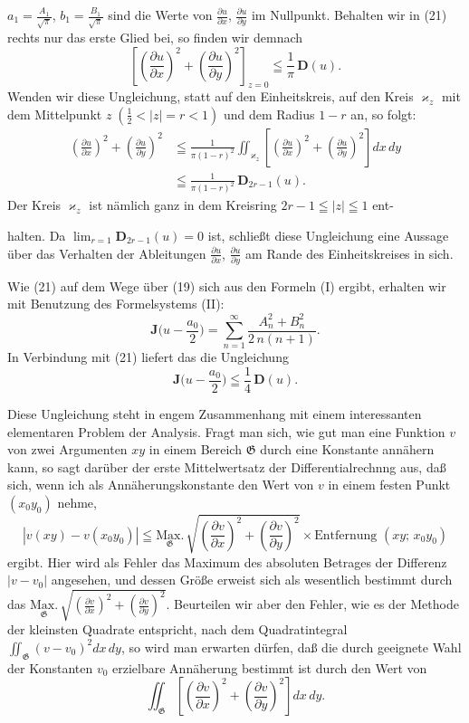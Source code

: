 \documentclass{article}
\begin{document}
$a_1 = \frac{A_1}{\sqrt{\pi}}$, $b_1 = \frac{B_1}{\sqrt{\pi}}$ sind die Werte von $\frac{\partial u}{\partial x}$, $\frac{\partial u}{\partial y}$ im Nullpunkt. Behalten wir in (21) rechts nur das erste Glied bei, so finden wir demnach
\[ \left[ \left(\frac{\partial u}{\partial x}\right)^2 + \left(\frac{\partial u}{\partial y}\right)^2 \right]_{z=0} \leqq \frac{1}{\pi}\,\mathbf{D}(u). \tag{22} \]
Wenden wir diese Ungleichung, statt auf den Einheitskreis, auf den Kreis $\varkappa_z$ mit dem Mittelpunkt $z\;(\frac{1}{2} < |z| = r < 1)$ und dem Radius $1 - r$ an, so folgt:
\[ \begin{aligned}
\left(\frac{\partial u}{\partial x}\right)^2 + \left(\frac{\partial u}{\partial y}\right)^2 &\leqq \frac{1}{\pi(1 - r)^2} \iint_{\varkappa_z} \left[ \left(\frac{\partial u}{\partial x}\right)^2 + \left(\frac{\partial u}{\partial y}\right)^2 \right] dx\,dy \\
&\leqq \frac{1}{\pi(1 - r)^2}\,\mathbf{D}_{2r-1}(u). \tag{23}
\end{aligned} \]
Der Kreis $\varkappa_z$ ist nämlich ganz in dem Kreisring $2r - 1 \leqq |z| \leqq 1$ ent-

halten. Da $\lim_{r=1} \mathbf{D}_{2r-1}(u) = 0$ ist, schließt diese Ungleichung eine Aussage über das Verhalten der Ableitungen $\frac{\partial u}{\partial x}$, $\frac{\partial u}{\partial y}$ am Rande des Einheitskreises in sich.

Wie (21) auf dem Wege über (19) sich aus den Formeln (I) ergibt, erhalten wir mit Benutzung des Formelsystems (II):
\[ \mathbf{J}\Big( u - \frac{a_0}{2} \Big) = \sum_{n=1}^\infty \frac{A_n^2 + B_n^2}{2\,n(n+1)}. \]
In Verbindung mit (21) liefert das die Ungleichung
\[ \mathbf{J}\Big( u - \frac{a_0}{2} \Big) \leqq \frac{1}{4}\,\mathbf{D}(u). \tag{24} \]

Diese Ungleichung steht in engem Zusammenhang mit einem interessanten elementaren Problem der Analysis. Fragt man sich, wie gut man eine Funktion $v$ von zwei Argumenten $xy$ in einem Bereich $\mathfrak{G}$ durch eine Konstante annähern kann, so sagt darüber der erste Mittelwertsatz der Differentialrechnng aus, daß sich, wenn ich als Annäherungskonstante den Wert von $v$ in einem festen Punkt $(x_0 y_0)$ nehme,
\[ | v(xy) - v(x_0 y_0) | \leqq \underset{\mathfrak{G}}{\mathrm{Max.}}\, \sqrt{\left(\frac{\partial v}{\partial x}\right)^2 + \left(\frac{\partial v}{\partial y}\right)^2} \times \text{Entfernung } (xy;\,x_0 y_0) \]
ergibt. Hier wird als Fehler das Maximum des absoluten Betrages der Differenz $|v - v_0|$ angesehen, und dessen Größe erweist sich als wesentlich bestimmt durch das $\underset{\mathfrak{G}}{\mathrm{Max.}}\,\sqrt{\left(\frac{\partial v}{\partial x}\right)^2 + \left(\frac{\partial v}{\partial y}\right)^2}$. Beurteilen wir aber den Fehler, wie es der Methode der kleinsten Quadrate entspricht, nach dem Quadratintegral $\displaystyle\iint_{\mathfrak{G}} (v - v_0)^2 dx\,dy$, so wird man erwarten dürfen, daß die durch geeignete Wahl der Konstanten $v_0$ erzielbare Annäherung bestimmt ist durch den Wert von
\[ \iint_{\mathfrak{G}} \left[ \left(\frac{\partial v}{\partial x}\right)^2 + \left(\frac{\partial v}{\partial y}\right)^2 \right] dx\,dy. \]
\end{document}

